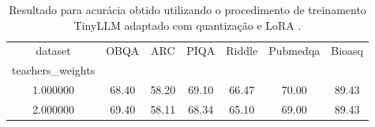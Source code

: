 \begin{table}
\caption{Resultado para acurácia obtido utilizando o procedimento de treinamento TinyLLM \cite{Tian2025} adaptado com quantização e LoRA \cite{Hu2021,Dettmers2023}.}
\label{tab:tinyllm:with:lora}
\begin{tabular}{ccccccc}
\toprule
dataset & OBQA & ARC & PIQA & Riddle & Pubmedqa & Bioasq \\
teachers_weights &  &  &  &  &  &  \\
\midrule
1.000000 & 68.40 & 58.20 & 69.10 & 66.47 & 70.00 & 89.43 \\
2.000000 & 69.40 & 58.11 & 68.34 & 65.10 & 69.00 & 89.43 \\
\bottomrule
\end{tabular}
\end{table}
